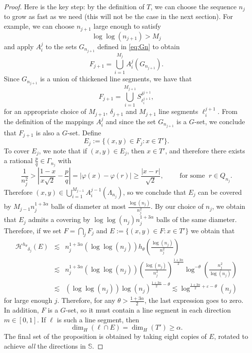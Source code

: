 \documentclass[11pt,a4paper]{amsart}
\begin{document}
\begin{proof}
Here is the key step: by the definition of  $T$, we can choose the sequence $n_{j}$ to grow as  fast  as we need  (this will not be the case in the next section). For example, we can choose $n_{j+1}$ large enough to satisfy
\begin{equation}\label{eq:njloglogMj}
\log\log(n_{j+1})>M_j
\end{equation}
and apply $A_i^j$ to the sets $G_{n_{j+1}}$ defined in
\eqref{eq:Gn} to obtain
\begin{equation*}
F_{j+1}=\bigcup_{i=1}^{M_j}A_i^j(G_{n_{j+1}}).
\end{equation*}
Since $G_{n_{j+1}}$ is a union of thickened line segments, we
have that
\begin{equation*}
F_{j+1}=\bigcup_{i=1}^{M_{j+1}}S_{\ell_i^{j+1}}^{\delta^{j+1}},
\end{equation*}
for an appropriate choice of $M_{j+1}$, $\delta_{j+1}$ and
$M_{j+1}$ line segments $\ell_i^{j+1}$. From the definition of
the mappings $A_i^j$ and since the set $G_{n_{j+1}}$ is a
$G$-set, we conclude that $F_{j+1}$ is also a $G$-set. Define
\begin{equation*}
E_j:=\{(x,y)\in F_j: x\in T'\}.
\end{equation*}
To cover $E_j$, we note that if $(x,y)\in E_j$, then $x\in T'$,
and therefore there exists a rational $\frac{p}{q}\in
\Gamma_{n_j}$ with
\begin{equation*}
\frac{1}{n_j^2}>\left|\frac{1-x}{x\sqrt{2}}-\frac{p}{q}\right|=|\varphi(x)-\varphi(r)|\ge\frac{|x-r|}{\sqrt{2}},\qquad
\text{ for some }\ r\in Q_{n_j}.
\end{equation*}
Therefore $(x,y)\in
\bigcup_{i=1}^{M_{j-1}}A^{j-1}_i(\Lambda_{n_j})$, so we conclude
that $E_j$ can be covered by $M_{j-1}n_{j}^{1+3\alpha}$ balls of
diameter at most $\frac{\log(n_{j})}{n_{j}^2}$. By our choice of
$n_j$, we obtain that $E_{j}$
admits a covering by $\log\log(n_{j})n_{j}^{1+3\alpha}$ balls of
the same diameter. Therefore, if we set $F=\bigcap_j F_j$ and
$E:=\{(x,y)\in F: x\in T'\} $ we obtain that
\begin{eqnarray*}
{\mathcal{H}^{{h_\theta}}}_{\delta_j}(E) & \lesssim  & n^{1+3\alpha}_{j}\left(\log\log(n_j)\right)h_\theta\left(\frac{\log(n_j)}{n^2_j}\right)\\
    & \lesssim & n^{1+3\alpha}_{j}\left(\log\log(n_j)\right)\left(\frac{\log(n_j)}{n^2_j}\right)^{\frac{1+3\alpha}{2}}\log^{-\theta}\left(\frac{n^2_j}{\log(n_j)}\right)\\
    & \lesssim & \left(\log\log(n_j)\right)\log(n_j)^{\frac{1+3\alpha}{2}-\theta}\lesssim  \log^{\frac{1+3\alpha}{2}+{\varepsilon}-\theta}(n_j)
\end{eqnarray*}
for large enough $j$. Therefore, for any
$\theta>\frac{1+3\alpha}{2}$, the last expression goes to zero.
In addition, $F$ is a $G$-set, so it must contain a line segment
in each direction $m\in[0,1]$. If $\ell$ is such a line segment,
then
\begin{equation*}
\dim_H(\ell\cap E)=\dim_H(T')\ge\alpha.
\end{equation*}
The final set of the proposition is obtained by taking eight
copies of $E$, rotated to achieve \emph{all} the directions in
${\mathbb{S}}$.
\end{proof}
\end{document}
